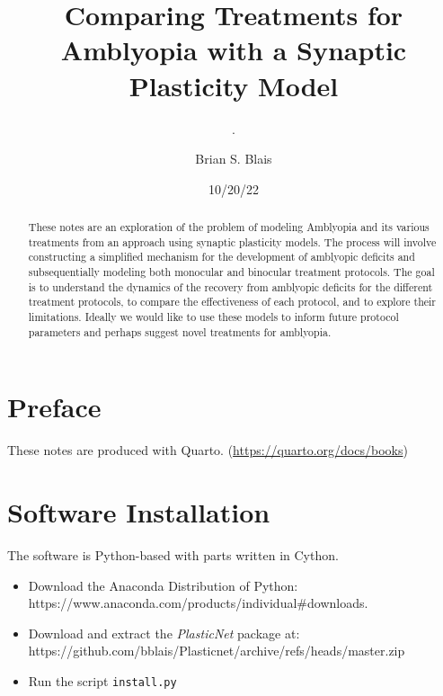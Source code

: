 \documentclass[
  letterpaper,
  DIV=11,
  numbers=noendperiod]{scrreprt}
\title{Comparing Treatments for Amblyopia with a Synaptic Plasticity
Model}
\subtitle{.}
\author{Brian S. Blais}
\date{10/20/22}
\providecommand{\tightlist}{%
  \setlength{\itemsep}{0pt}\setlength{\parskip}{0pt}}\usepackage{longtable,booktabs,array}
\renewcommand*\contentsname{Table of contents}
\newcommand\contentsname{Table of contents}
\begin{document}
\maketitle
\begin{abstract}
These notes are an exploration of the problem of modeling Amblyopia and
its various treatments from an approach using synaptic plasticity
models. The process will involve constructing a simplified mechanism for
the development of amblyopic deficits and subsequentially modeling both
monocular and binocular treatment protocols. The goal is to understand
the dynamics of the recovery from amblyopic deficits for the different
treatment protocols, to compare the effectiveness of each protocol, and
to explore their limitations. Ideally we would like to use these models
to inform future protocol parameters and perhaps suggest novel
treatments for amblyopia.
\end{abstract}
\ifdefined\Shaded\renewenvironment{Shaded}{\begin{tcolorbox}[sharp corners, boxrule=0pt, interior hidden, borderline west={3pt}{0pt}{shadecolor}, enhanced, frame hidden, breakable]}{\end{tcolorbox}}\fi

\renewcommand*\contentsname{Table of contents}
{
\hypersetup{linkcolor=}
\setcounter{tocdepth}{2}
\tableofcontents
}

\hypertarget{preface}{%
\chapter*{Preface}\label{preface}}

These notes are produced with Quarto.
(\url{https://quarto.org/docs/books})


\hypertarget{software-installation}{%
\chapter*{Software Installation}\label{software-installation}}

The software is Python-based with parts written in Cython.

\begin{itemize}
\tightlist
\item
  Download the Anaconda Distribution of Python:
  https://www.anaconda.com/products/individual\#downloads.\\
\item
  Download and extract the \emph{PlasticNet} package at:
  https://github.com/bblais/Plasticnet/archive/refs/heads/master.zip
\item
  Run the script \texttt{install.py}
\end{itemize}
\end{document}
